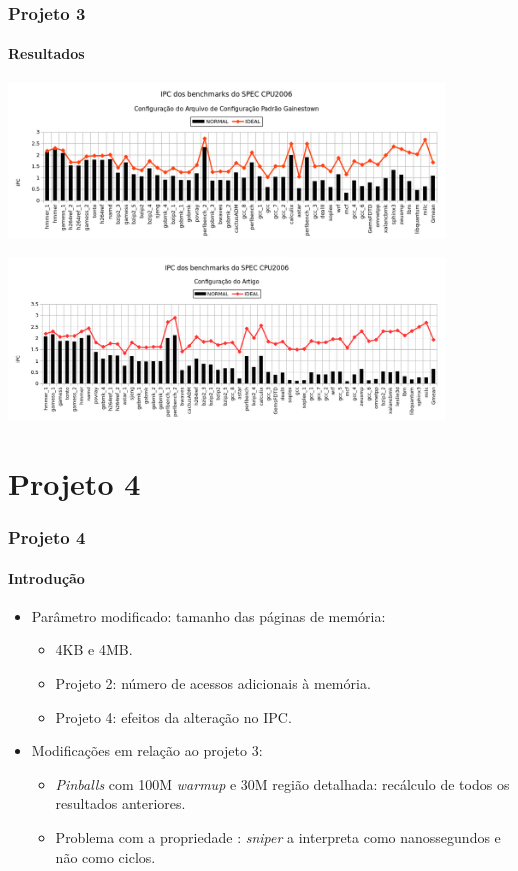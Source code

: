 \documentclass[10pt]{beamer}
\begin{document}
\begin{frame}
\frametitle{Projeto 3}
\framesubtitle{Resultados}

\centering
\includegraphics[width=0.87\textwidth]{images/gainestown}

\includegraphics[width=0.87\textwidth]{images/article}

\end{frame}

\section{Projeto 4}

\begin{frame}
\frametitle{Projeto 4}
\framesubtitle{Introdução}

\begin{itemize}

\item Parâmetro modificado: tamanho das páginas de memória:

\begin{itemize} 
	\item 4KB e 4MB.
	\item Projeto 2: número de acessos adicionais à memória. 
	\item Projeto 4: efeitos da alteração no IPC.
		
\end{itemize} 

\vspace{12pt}

\item Modificações em relação ao projeto 3:
 
\begin{itemize} 
	\item \textit{Pinballs} com 100M \textit{warmup} e 30M região detalhada:
	recálculo de todos os resultados anteriores.
  
  	\item Problema com a propriedade :
  	\textit{sniper} a interpreta como nanossegundos e não como ciclos.
	
\end{itemize} 
\end{itemize}

\end{frame}
\end{document}

